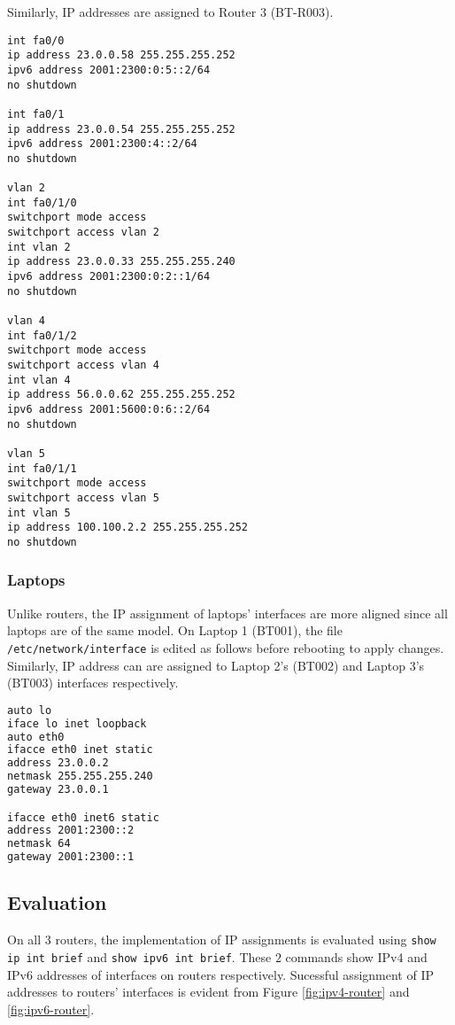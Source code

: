 Similarly, IP addresses are assigned to Router 3 (BT-R003).

\begin{lstlisting}
int fa0/0
ip address 23.0.0.58 255.255.255.252
ipv6 address 2001:2300:0:5::2/64
no shutdown

int fa0/1
ip address 23.0.0.54 255.255.255.252
ipv6 address 2001:2300:4::2/64
no shutdown

vlan 2
int fa0/1/0
switchport mode access
switchport access vlan 2
int vlan 2
ip address 23.0.0.33 255.255.255.240
ipv6 address 2001:2300:0:2::1/64
no shutdown

vlan 4
int fa0/1/2
switchport mode access
switchport access vlan 4
int vlan 4
ip address 56.0.0.62 255.255.255.252
ipv6 address 2001:5600:0:6::2/64
no shutdown

vlan 5
int fa0/1/1
switchport mode access
switchport access vlan 5
int vlan 5
ip address 100.100.2.2 255.255.255.252
no shutdown
\end{lstlisting}

\subsubsection{Laptops}

Unlike routers, the IP assignment of laptops' interfaces are more aligned since all laptops are of the same model. 
On Laptop 1 (BT001), the file \texttt{/etc/network/interface} is edited as follows before rebooting to apply changes. 
Similarly, IP address can are assigned to Laptop 2's (BT002) and Laptop 3's (BT003) interfaces respectively.

\begin{lstlisting}[language=sh]
auto lo
iface lo inet loopback
auto eth0
ifacce eth0 inet static 
address 23.0.0.2
netmask 255.255.255.240
gateway 23.0.0.1

ifacce eth0 inet6 static 
address 2001:2300::2
netmask 64
gateway 2001:2300::1
\end{lstlisting}

\subsection{Evaluation}

On all $3$ routers, the implementation of IP assignments is evaluated using \texttt{show ip int brief} and \texttt{show ipv6 int brief}. These $2$ commands show IPv4 and IPv6 addresses of interfaces on routers respectively.
Sucessful assignment of IP addresses to routers' interfaces is evident from Figure \ref{fig:ipv4-router} and \ref{fig:ipv6-router}.

